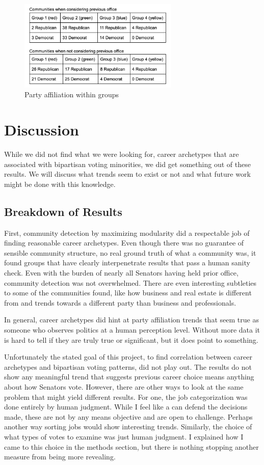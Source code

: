 \documentclass[11pt,twocolumn]{article}
\begin{document}
\begin{figure}[H]
    \centering
    \includegraphics[width=3in]{rep_dem}
    \caption{Party affiliation within groups}
    \label{fig:ds}
\end{figure}

	\section{Discussion}
	While we did not find what we were looking for, career archetypes that are associated with bipartisan voting minorities, we did get something out of these results. We will discuss what trends seem to exist or not and what future work might be done with this knowledge.
	\subsection{Breakdown of Results}
	First, community detection by maximizing modularity did a respectable job of finding reasonable career archetypes. Even though there was no guarantee of sensible community structure, no real ground truth of what a community was, it found groups that have clearly interpenetrate results that pass a human sanity check. Even with the burden of nearly all Senators having held prior office, community detection was not overwhelmed. There are even interesting subtleties to some of the communities found, like how business and real estate is different from and trends towards a different party than business and professionals.
	
	In general, career archetypes did hint at party affiliation trends that seem true as someone who observes politics at a human perception level. Without more data it is hard to tell if they are truly true or significant, but it does point to something.
	
	Unfortunately the stated goal of this project, to find correlation between career archetypes and bipartisan voting patterns, did not play out. The results do not show any meaningful trend that suggests previous career choice means anything about how Senators vote. However, there are other ways to look at the same problem that might yield different results. For one, the job categorization was done entirely by human judgment. While I feel like a can defend the decisions made, these are not by any means objective and are open to challenge. Perhaps another way sorting jobs would show interesting trends. Similarly, the choice of what types of votes to examine was just human judgment. I explained how I came to this choice in the methods section, but there is nothing stopping another measure from being more revealing.
	
\end{document}
